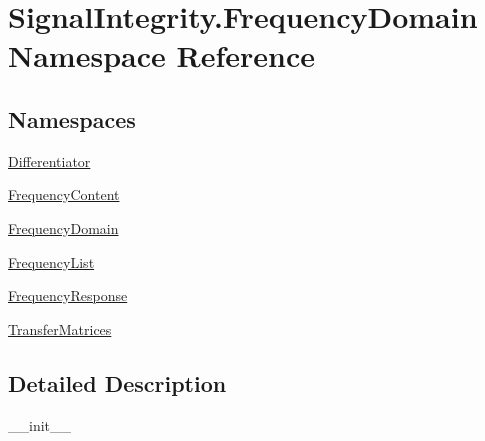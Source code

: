 \hypertarget{namespaceSignalIntegrity_1_1FrequencyDomain}{}\section{Signal\+Integrity.\+Frequency\+Domain Namespace Reference}
\label{namespaceSignalIntegrity_1_1FrequencyDomain}
\subsection*{Namespaces}
\begin{DoxyCompactItemize}
\item 
 \hyperlink{namespaceSignalIntegrity_1_1FrequencyDomain_1_1Differentiator}{Differentiator}
\item 
 \hyperlink{namespaceSignalIntegrity_1_1FrequencyDomain_1_1FrequencyContent}{Frequency\+Content}
\item 
 \hyperlink{namespaceSignalIntegrity_1_1FrequencyDomain_1_1FrequencyDomain}{Frequency\+Domain}
\item 
 \hyperlink{namespaceSignalIntegrity_1_1FrequencyDomain_1_1FrequencyList}{Frequency\+List}
\item 
 \hyperlink{namespaceSignalIntegrity_1_1FrequencyDomain_1_1FrequencyResponse}{Frequency\+Response}
\item 
 \hyperlink{namespaceSignalIntegrity_1_1FrequencyDomain_1_1TransferMatrices}{Transfer\+Matrices}
\end{DoxyCompactItemize}


\subsection{Detailed Description}
\begin{DoxyVerb}__init__\end{DoxyVerb}
 